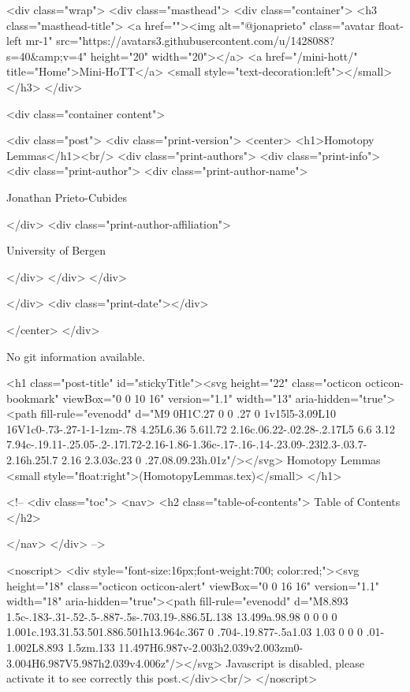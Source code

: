     <div class="wrap">
      <div class="masthead">
        <div class="container">
          <h3 class="masthead-title">
            <a href=""><img alt="@jonaprieto" class="avatar float-left mr-1" src="https://avatars3.githubusercontent.com/u/1428088?s=40&amp;v=4" height="20" width="20"></a>
            <a href="/mini-hott/" title="Home">Mini-HoTT</a>
            <small style="text-decoration:left"></small>
          </h3>
        </div>
      
      <div class="container content">
        







<div class="post">
  <div class="print-version">
    <center>
      <h1>Homotopy Lemmas</h1><br/>
        <div class="print-authors">
          <div class="print-info">
            <div class="print-author">
              <div class="print-author-name">
                
                  Jonathan Prieto-Cubides
                
              </div>
              <div class="print-author-affiliation">
                
                  University of Bergen
                
                </div>
            </div>
          </div>
          
          
        </div>
        <div class="print-date"></div>
        
        
    </center>
  </div>

  
  No git information available.
  

  <h1 class="post-title" id="stickyTitle"><svg height="22" class="octicon octicon-bookmark" viewBox="0 0 10 16" version="1.1" width="13" aria-hidden="true"><path fill-rule="evenodd" d="M9 0H1C.27 0 0 .27 0 1v15l5-3.09L10 16V1c0-.73-.27-1-1-1zm-.78 4.25L6.36 5.61l.72 2.16c.06.22-.02.28-.2.17L5 6.6 3.12 7.94c-.19.11-.25.05-.2-.17l.72-2.16-1.86-1.36c-.17-.16-.14-.23.09-.23l2.3-.03.7-2.16h.25l.7 2.16 2.3.03c.23 0 .27.08.09.23h.01z"/></svg> Homotopy Lemmas <small style="float:right">(HomotopyLemmas.tex)</small>
  </h1>

  <!-- 
  <div class="toc">
    <nav>
    <h2 class="table-of-contents"> Table of Contents </h2>
      

    </nav>
  </div>
   -->

  <noscript>
  <div style="font-size:16px;font-weight:700; color:red;"><svg height="18" class="octicon octicon-alert" viewBox="0 0 16 16" version="1.1" width="18" aria-hidden="true"><path fill-rule="evenodd" d="M8.893 1.5c-.183-.31-.52-.5-.887-.5s-.703.19-.886.5L.138 13.499a.98.98 0 0 0 0 1.001c.193.31.53.501.886.501h13.964c.367 0 .704-.19.877-.5a1.03 1.03 0 0 0 .01-1.002L8.893 1.5zm.133 11.497H6.987v-2.003h2.039v2.003zm0-3.004H6.987V5.987h2.039v4.006z"/></svg> Javascript is disabled, please activate it to see correctly this post.</div><br/>
  </noscript>

